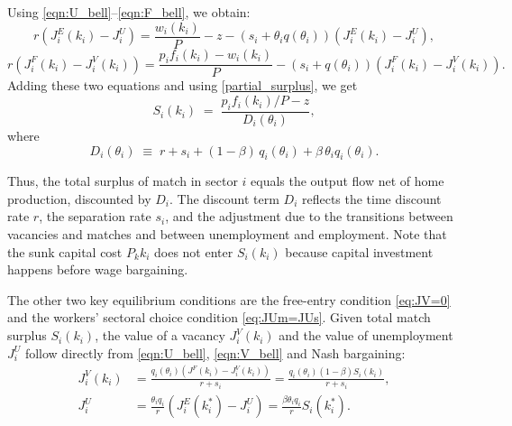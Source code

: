 \documentclass[12pt]{article} %
\theoremstyle{definition}
\begin{document}
Using \eqref{eqn:U_bell}–\eqref{eqn:F_bell}, we obtain:
\begin{equation}
    r(J^E_i(k_i)-J^U_i) = \frac{w_i(k_i)}{P} -z- (s_i+\theta_iq(\theta_i))(J^E_i(k_i)-J^U_i),
\end{equation}
\begin{equation}\label{eq:JF-JV}
    r(J^F_i(k_i)-J^V_i(k_i)) = \frac{p_if_i(k_i) -w_i(k_i)}{P}  - (s_i+q(\theta_i))(J^F_i(k_i)-J^V_i(k_i)).
\end{equation}
Adding these two equations and using \eqref{partial_surplus}, we get
\begin{equation}\label{eq:Si}
S_i(k_i)\;=\;\frac{p_if_i(k_i)/P-z}{D_i(\theta_i)}, \label{eq:Si(k)}
\end{equation}
where
\begin{equation}\label{eq:Di}
D_i(\theta_i)\;\equiv\; r+s_i+(1-\beta)\,q_i(\theta_i)+\beta\,\theta_i q_i(\theta_i).  \label{eq:Di}
\end{equation}


Thus, the total surplus of match in sector $i$ equals the output flow net of home production, discounted by $D_i$. The discount term $D_i$ reflects the time discount rate $r$, the separation rate $s_i$, and the adjustment due to the transitions between vacancies and matches and between unemployment and employment.  Note that the sunk capital cost $P_kk_i$ does not enter $S_i(k_i)$  because capital investment happens before  wage bargaining. 


The other two key equilibrium conditions are the free-entry condition  \eqref{eq:JV=0} and the workers' sectoral choice condition \eqref{eq:JUm=JUs}. Given total match surplus $S_i(k_i)$, the value of a vacancy $J^V_i(k_i)$ and the value of unemployment $J^U_i$  follow directly from \eqref{eqn:U_bell}, \eqref{eqn:V_bell} and Nash bargaining:
\begin{align}
    J^V_i(k_i) &= \frac{q_i(\theta_i)(J^F(k_i)-J_i^V(k_i))}{r+s_i} = \frac{q_i(\theta_i)(1-\beta)S_i(k_i)}{r+s_i}, \\
    J^U_i &= \frac{\theta_iq_i}{r}(J^E_i(k^*_i)-J^U_i) = \frac{\beta\theta_iq_i}{r}S_i(k_i^*).
\end{align}
\end{document}
